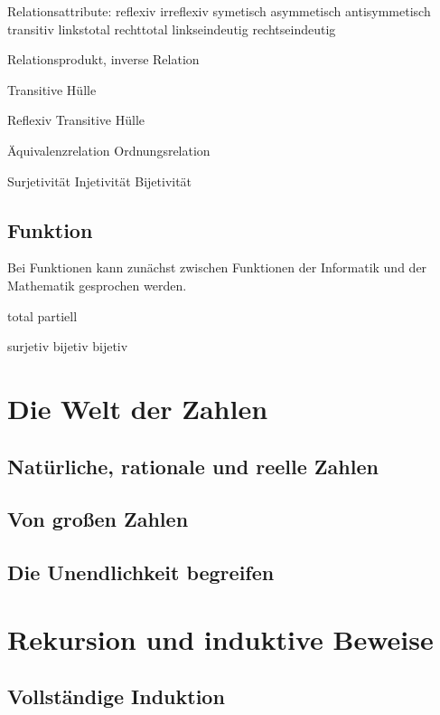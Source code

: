 Relationsattribute:
reflexiv
irreflexiv
symetisch
asymmetisch
antisymmetisch
transitiv
linkstotal
rechttotal
linkseindeutig
rechtseindeutig

Relationsprodukt, inverse Relation

Transitive Hülle

Reflexiv Transitive Hülle

Äquivalenzrelation
Ordnungsrelation


Surjetivität
Injetivität
Bijetivität


\subsection{Funktion}

Bei Funktionen kann zunächst zwischen Funktionen der Informatik und der Mathematik gesprochen werden. 

total 
partiell

surjetiv
bijetiv
bijetiv


\section{Die Welt der Zahlen}
\subsection{Natürliche, rationale und reelle Zahlen}
\subsection{Von großen Zahlen}
\subsection{Die Unendlichkeit begreifen}

\section{Rekursion und induktive Beweise}
\subsection{Vollständige Induktion}





